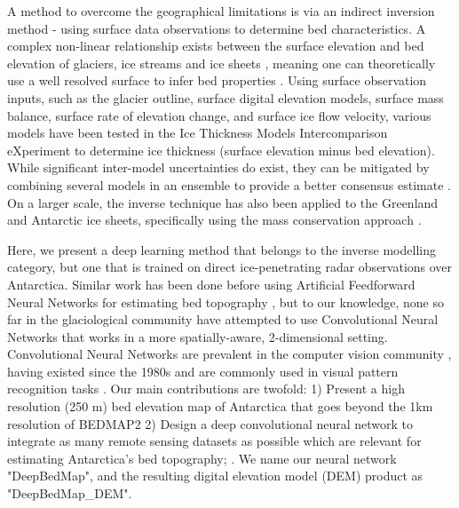 \documentclass[tc, manuscript]{copernicus}
\begin{document}
A method to overcome the geographical limitations is via an indirect inversion method - using surface data observations to determine bed characteristics.
A complex non-linear relationship exists between the surface elevation and bed elevation of glaciers, ice streams and ice sheets \citep{Raymondrelationshipsurfacebasal2005}, meaning one can theoretically use a well resolved surface to infer bed properties \citep[e.g.][]{Farinottimethodestimateice2009}.
Using surface observation inputs, such as the glacier outline, surface digital elevation models, surface mass balance, surface rate of elevation change, and surface ice flow velocity, various models have been tested in the Ice Thickness Models Intercomparison eXperiment \citep[ITMIX,][]{FarinottiHowaccurateare2017} to determine ice thickness (surface elevation minus bed elevation).
While significant inter-model uncertainties do exist, they can be mitigated by combining several models in an ensemble to provide a better consensus estimate \citep{Farinotticonsensusestimateice2019}.
On a larger scale, the inverse technique has also been applied to the Greenland \citep{MorlighemBedMachinev3Complete2017} and Antarctic \citep{MorlighemDeepglacialtroughs2019} ice sheets, specifically using the mass conservation approach \citep{Morlighemmassconservationapproach2011}.

Here, we present a deep learning method that belongs to the inverse modelling category, but one that is trained on direct ice-penetrating radar observations over Antarctica.
Similar work has been done before using Artificial Feedforward Neural Networks for estimating bed topography \citep[e.g.][]{ClarkeNeuralNetworksApplied2009,MonnierInferencebedtopography2018}, but to our knowledge, none so far in the glaciological community have attempted to use Convolutional Neural Networks that works in a more spatially-aware, 2-dimensional setting.
Convolutional Neural Networks are prevalent in the computer vision community \citep[see][for a review]{LeCunDeeplearning2015}, having existed since the 1980s \citep{FukushimaNeocognitronnewalgorithm1982,LeCunBackpropagationAppliedHandwritten1989} and are commonly used in visual pattern recognition tasks \citep[e.g.][]{LecunGradientbasedlearningapplied1998,KrizhevskyImageNetClassificationDeep2012}.
Our main contributions are twofold:
1) Present a high resolution (250 m) bed elevation map of Antarctica that goes beyond the 1km resolution of BEDMAP2
2) Design a deep convolutional neural network to integrate as many remote sensing datasets as possible which are relevant for estimating Antarctica's bed topography;
 \citep{FretwellBedmap2improvedice2013}.
We name our neural network "DeepBedMap", and the resulting digital elevation model (DEM) product as "DeepBedMap\_DEM".
\end{document}
